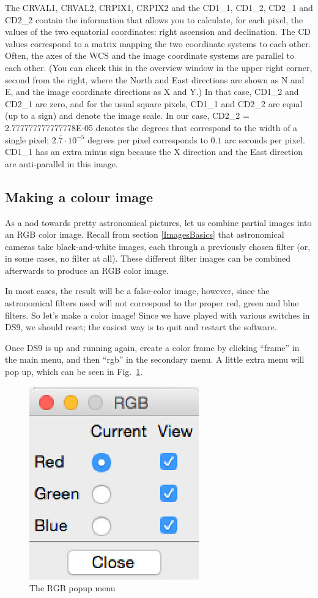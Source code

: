 \documentclass[twocolumn,apj]{openjournal}
\begin{document}
The CRVAL1, CRVAL2, CRPIX1, CRPIX2 and the CD1\_1, CD1\_2, CD2\_1 and CD2\_2 contain the information that allows you to calculate, for each pixel, the values of the two equatorial coordinates: right ascension and declination. The CD values correspond to a matrix mapping the two coordinate systems to each other. Often, the axes of the WCS and the image coordinate systems are parallel to each other. (You can check this in the overview window in the upper right corner, second from the right, where the North and East directions are shown as N and E, and the image coordinate directions as X and Y.) In that case, CD1\_2 and CD2\_1 are zero, and for the usual square pixels, CD1\_1 and CD2\_2 are equal (up to a sign) and denote the image scale. In our case, CD2\_2 = 2.777777777777778E-05 denotes the degrees that correspond to the width of a single pixel; 
$2.\overline{7}\cdot 10^{-5}$ degrees per pixel corresponds to $0.1$ arc seconds per pixel. CD1\_1 has an extra minus sign because the X direction and the East direction are anti-parallel in this image.

\subsection{Making a colour image}
\label{MakingColourImage}

As a nod towards pretty astronomical pictures, let us combine partial images into an RGB color image. Recall from section \ref{ImagesBasics} that astronomical cameras take black-and-white images, each through a previously chosen filter (or, in some cases, no filter at all). These different filter images can be combined afterwards to produce an RGB color image. 

In most cases, the result will be a false-color image, however, since the astronomical filters used will not correspond to the proper red, green and blue filters. So let's make a color image! Since we have played with various switches in DS9, we should reset; the easiest way is to quit and restart the software.

Once DS9 is up and running again, create a color frame by clicking ``frame'' in the main menu, and then ``rgb'' in the secondary menu. A little extra menu will pop up, which can be seen in Fig.~\ref{RGBMenu}.
\begin{figure}[htbp]
\begin{center}
\includegraphics[width=0.25\linewidth]{rgbkaestchen.jpg}
\caption{The RGB popup menu}
\label{RGBMenu}
\end{center}
\end{figure}                          
\end{document}
